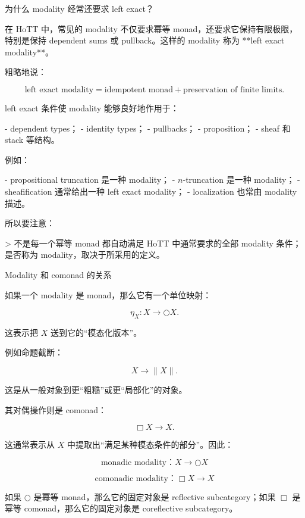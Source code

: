 \documentclass{beamer}
\begin{document}
\begin{frame}{为什么 modality 经常还要求 left exact？}
\begin{markdown}
在 HoTT 中，常见的 modality 不仅要求幂等 monad，还要求它保持有限极限，特别是保持 dependent sums 或 pullback。这样的 modality 称为 **left exact modality**。

粗略地说：

$$
\text{left exact modality} = \text{idempotent monad} + \text{preservation of finite limits}.
$$

left exact 条件使 modality 能够良好地作用于：

- dependent types；
- identity types；
- pullbacks；
- proposition；
- sheaf 和 stack 等结构。

例如：

- propositional truncation 是一种 modality；
- $n$-truncation 是一种 modality；
- sheafification 通常给出一种 left exact modality；
- localization 也常由 modality 描述。

所以要注意：

> 不是每一个幂等 monad 都自动满足 HoTT 中通常要求的全部 modality 条件；是否称为 modality，取决于所采用的定义。
\end{markdown}
\end{frame}

\begin{frame}{ Modality 和 comonad 的关系}
\begin{markdown}
如果一个 modality 是 monad，那么它有一个单位映射：

$$
\eta_X:X\to \bigcirc X.
$$

这表示把 $X$ 送到它的“模态化版本”。

例如命题截断：

$$
X\to \|X\|.
$$

这是从一般对象到更“粗糙”或更“局部化”的对象。

其对偶操作则是 comonad：

$$
\Box X\to X.
$$

这通常表示从 $X$ 中提取出“满足某种模态条件的部分”。因此：

$$
\boxed{
\text{monadic modality：} X\to \bigcirc X
}
$$

$$
\boxed{
\text{comonadic modality：} \Box X\to X
}
$$

如果 $\bigcirc$ 是幂等 monad，那么它的固定对象是 reflective subcategory；如果 $\Box$ 是幂等 comonad，那么它的固定对象是 coreflective subcategory。
\end{markdown}
\end{frame}
\end{document}
